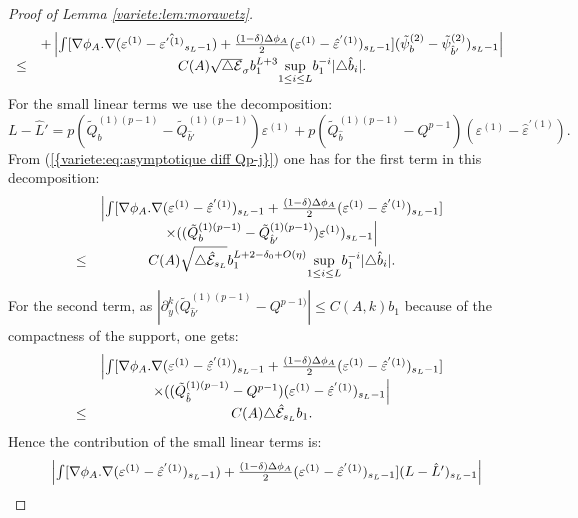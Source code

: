 \documentclass[11pt,a4paper,reqno]{amsart}
\theoremstyle{remark}
\numberwithin{equation}{section}
\begin{document}
\begin{proof}[Proof of Lemma \ref{variete:lem:morawetz}]
\begin{equation}
\begin{array}{r c l}
&+\left|\int [\nabla \phi_A .\nabla(\varepsilon^{(1)}-\hat{\varepsilon^{'(1)}}_{s_L-1})+\frac{(1-\delta)\Delta \phi_A}{2}(\varepsilon^{(1)}-\hat{\varepsilon}^{'(1)})_{s_L-1}](\tilde{\psi}^{(2)}_b-\tilde{\psi}_{\hat{b}'}^{(2)})_{s_L-1}\right|\\
\leq& C(A) \sqrt{\triangle \mathcal{E}}_{\sigma} b_1^{L+3} \underset{1\leq i \leq L}{\text{sup}}b_1^{-i}|\triangle \hat{b}_i|.
\end{array}
\end{equation}
For the small linear terms we use the decomposition:
$$
L-\hat{L}'=p(\tilde{Q}_{b}^{(1)(p-1)}-\tilde{Q}_{\hat{b}'}^{(1)(p-1)})\varepsilon^{(1)}+p(\tilde{Q}_{\hat{b}}^{(1)(p-1)}-Q^{p-1})(\varepsilon^{(1)}-\hat{\varepsilon}^{'(1)}).
$$
From {{\rm (\ref{{variete:eq:asymptotique diff Qp-j}})}} one has for the first term in this decomposition:
$$
\begin{array}{r c l}
&\Bigl{|}\int [\nabla \phi_A .\nabla(\varepsilon^{(1)}-\hat{\varepsilon}^{'(1)})_{s_L-1}+\frac{(1-\delta)\Delta \phi_A}{2}(\varepsilon^{(1)}-\hat{\varepsilon}^{'(1)})_{s_L-1}]\\
&\times((\tilde{Q}_{b}^{(1)(p-1)}-\tilde{Q}_{\hat{b}'}^{(1)(p-1)})\varepsilon^{(1)})_{s_L-1}\Bigr{|}\\
\leq & C(A)\sqrt{\triangle \hat{\mathcal{E}}_{s_L}}b_1^{L+2-\delta_0+O(\eta)}\underset{1\leq i \leq L}{\text{sup}}b_1^{-i}|\triangle \hat{b}_i|.
\end{array}
$$
For the second term, as $|\partial_y^k(\tilde{Q}_{\hat{b}'}^{(1)(p-1)}-Q^{p-1)}|\leq C(A,k)b_1$ because of the compactness of the support, one gets:
$$
\begin{array}{r c l}
&\Bigl{|}\int [\nabla \phi_A .\nabla(\varepsilon^{(1)}-\hat{\varepsilon}^{'(1)})_{s_L-1}+\frac{(1-\delta)\Delta \phi_A}{2}(\varepsilon^{(1)}-\hat{\varepsilon}^{'(1)})_{s_L-1}]\\
&\times ((\tilde{Q}_{\hat{b}}^{(1)(p-1)}-Q^{p-1})(\varepsilon^{(1)}-\hat{\varepsilon}^{'(1)})_{s_L-1}\Bigr{|}\\
\leq & C(A)\triangle \hat{\mathcal{E}}_{s_L}b_1.
\end{array}
$$
Hence the contribution of the small linear terms is:
\begin{equation} \label{variete:morawetz:eq:estimation L}
\begin{array}{r c l}
&\left|\int [\nabla \phi_A .\nabla(\varepsilon^{(1)}-\hat{\varepsilon}^{'(1)})_{s_L-1})+\frac{(1-\delta)\Delta \phi_A}{2}(\varepsilon^{(1)}-\hat{\varepsilon}^{'(1)})_{s_L-1}](L-\hat{L}')_{s_L-1}\right|\\

\end{array}
\end{equation}
\end{proof}
\end{document}
